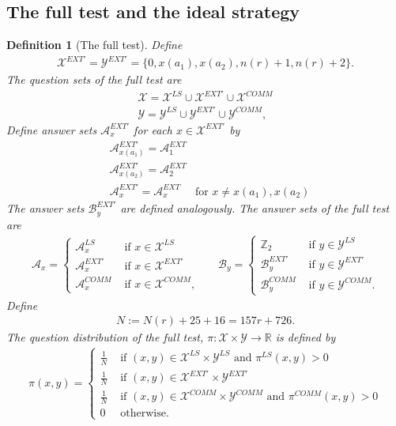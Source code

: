 \documentclass[11pt,letterpaper]{article}
\newcommand{\R}{\mathbb{R}}
\newcommand{\Z}{\mathbb{Z}}
\newcommand{\calX}{\mathcal{X}}
\newcommand{\calY}{\mathcal{Y}}
\newcommand{\calA}{\mathcal{A}}
\newcommand{\calB}{\mathcal{B}}
\newcommand{\1}{\mathbb{1}}
\newcommand{\EXT}{EXT}
\newcommand{\LS}{LS}
\newcommand{\COMM}{COMM}
\newcommand{\nr}{n(r)}
\newtheorem{definition}[theorem]{Definition}
\theoremstyle{definition}
\begin{document}
\subsection{The full test and the ideal strategy}
\label{sec:ideal_strat}
\begin{definition}[The full test]
\label{def:full_test}
Define 
\begin{align*}
    \calX^{\EXT'} = \calY^{\EXT'} = \{0, x(a_1), x(a_2), \nr+1, \nr+2\}.
\end{align*}
The question sets of the full test are
\begin{align*}
    \calX = \calX^{\LS} \cup \calX^{\EXT'} \cup \calX^{\COMM} \\
    \calY = \calY^{\LS} \cup \calY^{\EXT'} \cup \calY^{\COMM},
\end{align*}
Define answer sets $\calA_x^{\EXT'}$ for each $x \in \calX^{\EXT'}$
by 
\begin{align*}
    &\calA_{x(a_1)}^{\EXT'} =\calA_{1}^{\EXT} \\
    &\calA_{x(a_2)}^{\EXT'} =\calA_{2}^{\EXT} \\
    &\calA_{x}^{\EXT'} = \calA_{x}^{\EXT} 
    \quad \text{ for } x \neq x(a_1), x(a_2)
\end{align*}
The answer sets $\calB_y^{\EXT'}$ are defined analogously.
The answer sets of the full test are
\begin{align*}
    \calA_x = 
    \begin{cases}
    \calA_x^{\LS} &\text{ if } x \in \calX^{\LS} \\
    \calA_x^{\EXT'} &\text{ if } x \in \calX^{\EXT'} \\
    \calA_x^{\COMM} & \text{ if } x \in \calX^{\COMM},
    \end{cases}
    &&
    \calB_y = 
    \begin{cases}
    \Z_2 &\text{ if } y \in \calY^{\LS} \\
    \calB_y^{\EXT'} &\text{ if } y \in \calY^{\EXT'} \\
    \calB_y^{\COMM} & \text{ if } y \in \calY^{\COMM}.
    \end{cases}
\end{align*}
Define 
\begin{align*}
    N :=  N(r) + 25 + 16 = 157r + 726.
\end{align*}
The question distribution of the full test, $\pi: \calX \times \calY \rightarrow \R$ is defined by
\begin{align*}
    \pi(x,y) = \begin{cases}
    \frac{1}{N} & \text{ if } (x,y) \in \calX^{\LS} \times \calY^{\LS} 
    \text{ and } \pi^{\LS}(x,y) > 0 \\
    \frac{1}{N} & \text{ if } (x,y) \in \calX^{\EXT'} \times \calY^{\EXT'}\\
    \frac{1}{N} & \text{ if } (x,y) \in \calX^{\COMM} \times \calY^{\COMM} 
    \text{ and } \pi^{\COMM}(x,y) > 0 \\
    0 & \text{ otherwise}.
    \end{cases}
\end{align*}
\end{definition}
\end{document}
